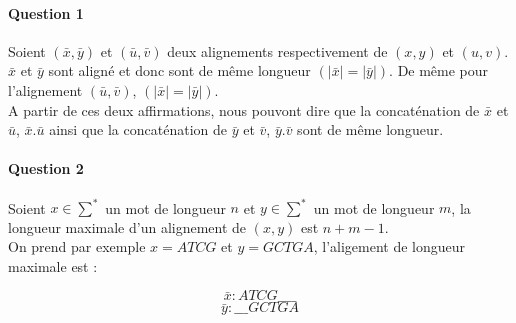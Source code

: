 \paragraph{Question 1}
Soient $(\bar x,\bar y)$ et $(\bar u, \bar v)$ deux alignements respectivement de $(x, y)$ et $(u, v)$. $\bar x$ et $\bar y$ sont aligné et donc sont de même longueur $(|\bar x| = |\bar y|)$. De même pour l'alignement $(\bar u, \bar v)$, $(|\bar x| = |\bar y|)$.\\
A partir de ces deux affirmations, nous pouvont dire que la concaténation de $\bar x$ et $\bar u$, $\bar x.\bar u$ ainsi que la concaténation de $\bar y$ et $\bar v$, $\bar y.\bar v$ sont de même longueur.

\paragraph{Question 2}
Soient $x \in \sum^*$ un mot de longueur $n$ et $y \in \sum^*$ un mot de longueur $m$, la longueur maximale d'un alignement de $(x,y)$ est $n+m-1$.\\
On prend par exemple $x=ATCG$ et $y=GCTGA$, l'aligement de longueur maximale est :

$$\bar x : ATCG\_\_\_\_$$
$$\bar y : \_\_\_GCTGA$$
